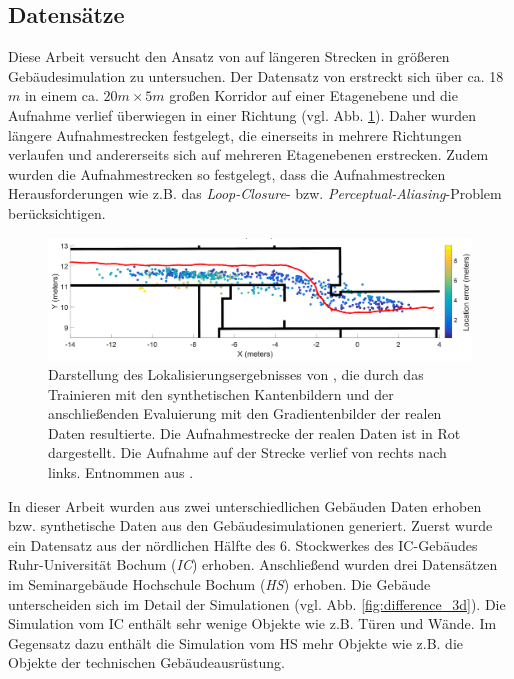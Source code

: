 \subsection{Datensätze}
\label{subsec:datasets}
Diese Arbeit versucht den Ansatz von \citet{acharyaBIMPoseNetIndoorCamera2019} auf längeren Strecken in größeren Gebäudesimulation zu untersuchen. Der Datensatz von \citet{acharyaBIMPoseNetIndoorCamera2019} erstreckt sich über ca. 18$m$ in einem ca. $20m \times 5m$ großen Korridor auf einer Etagenebene und die Aufnahme verlief überwiegen in einer Richtung (vgl. Abb. \ref{fig:acharya_traj}). Daher wurden längere Aufnahmestrecken festgelegt, die einerseits in mehrere Richtungen verlaufen und andererseits sich auf mehreren Etagenebenen erstrecken. Zudem wurden die Aufnahmestrecken so festgelegt, dass die Aufnahmestrecken Herausforderungen wie z.B. das \textit{Loop-Closure}- bzw. \textit{Perceptual-Aliasing}-Problem berücksichtigen.

\begin{figure}
	\centering
	\includegraphics[width=1.0\textwidth]{images/trajectories/acharya_traj.png}
	\caption{Darstellung des Lokalisierungsergebnisses von \citet{acharyaBIMPoseNetIndoorCamera2019}, die durch das Trainieren mit den synthetischen Kantenbildern und der anschließenden Evaluierung mit den Gradientenbilder der realen Daten resultierte. Die Aufnahmestrecke der realen Daten ist in Rot dargestellt. Die Aufnahme auf der Strecke verlief von rechts nach links. Entnommen aus \cite{acharyaBIMPoseNetIndoorCamera2019}.}
	\label{fig:acharya_traj}
\end{figure}



In dieser Arbeit wurden aus zwei unterschiedlichen Gebäuden Daten erhoben bzw. synthetische Daten aus den Gebäudesimulationen generiert. Zuerst wurde ein Datensatz aus der nördlichen Hälfte des 6. Stockwerkes des IC-Gebäudes Ruhr-Universität Bochum (\textit{IC}) erhoben. Anschließend wurden drei Datensätzen im Seminargebäude Hochschule Bochum (\textit{HS}) erhoben. Die Gebäude unterscheiden sich im Detail der Simulationen (vgl.  Abb. \ref{fig:difference_3d}). Die Simulation vom IC enthält sehr wenige Objekte wie z.B. Türen und Wände. Im Gegensatz dazu enthält die Simulation vom HS mehr Objekte wie z.B. die Objekte der technischen Gebäudeausrüstung.

